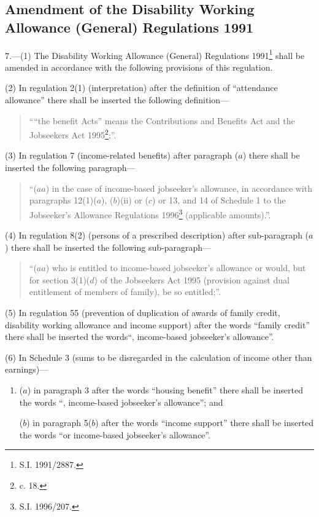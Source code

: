 \documentclass[a4paper]{article}
\begin{document}
\subsection[7. Amendment of the Disability Working Allowance (General) Regulations 1991]{Amendment of the Disability Working Allowance (General) Regulations 1991}

7.—(1) The Disability Working Allowance (General) Regulations 1991\footnote{\frenchspacing S.I. 1991/2887.} shall be amended in accordance with the following provisions of this regulation.

(2) In regulation 2(1) (interpretation) after the definition of “attendance allowance” there shall be inserted the following definition—
\begin{quotation}
““the benefit Acts” means the Contributions and Benefits Act and the Jobseekers Act 1995\footnote{ c. 18.};”.
\end{quotation}

(3) In regulation 7 (income-related benefits) after paragraph ($a$) there shall be inserted the following paragraph—
\begin{quotation}
“($aa$) in the case of income-based jobseeker’s allowance, in accordance with paragraphs 12(1)($a$), ($b$)(ii) or ($c$) or 13, and 14 of Schedule 1 to the Jobseeker’s Allowance Regulations 1996\footnote{\frenchspacing S.I. 1996/207.} (applicable amounts).”.
\end{quotation}

(4) In regulation 8(2) (persons of a prescribed description) after sub-\hspace{0pt}paragraph ($a$) there shall be inserted the following sub-paragraph—
\begin{quotation}
“($aa$) who is entitled to income-based jobseeker’s allowance or would, but for section 3(1)($d$) of the Jobseekers Act 1995 (provision against dual entitlement of members of family), be so entitled;”.
\end{quotation}

(5) In regulation 55 (prevention of duplication of awards of family credit, disability working allowance and income support) after the words “family credit” there shall be inserted the words“, income-based jobseeker’s allowance”.

(6) In Schedule 3 (sums to be disregarded in the calculation of income other than earnings)—
\begin{enumerate}\item[]
($a$) in paragraph 3 after the words “housing benefit” there shall be inserted the words “, income-based jobseeker’s allowance”; and

($b$) in paragraph 5($b$) after the words “income support” there shall be inserted the words “or income-based jobseeker’s allowance”.
\end{enumerate}
\end{document}
